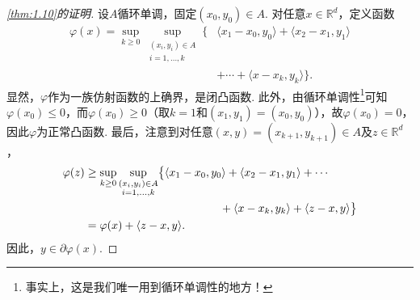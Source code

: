 \begin{proof}[\autoref{thm:1.10}的证明]
设$A$循环单调，固定$(x_0,y_0)\in A$. 对任意$x\in\mathbb R^d$，定义函数
$$
\begin{aligned}
\varphi(x)=\sup_{k\geq0}\sup_{\substack{(x_i,y_i)\in A\\i=1,\ldots,k}}
\bigl\{&\langle x_1-x_0,y_0\rangle+\langle x_2-x_1,y_1\rangle\\
&+\cdots+\langle x-x_k,y_k\rangle\bigr\}.
\end{aligned}
$$
显然，$\varphi$作为一族仿射函数的上确界，是闭凸函数. 此外，由循环单调性\footnote{事实上，这是我们唯一用到循环单调性的地方！}可知$\varphi(x_0)\leq0$，而$\varphi(x_0)\geq0$（取$k=1$和$(x_1,y_1)=(x_0,y_0)$），故$\varphi(x_0)=0$，因此$\varphi$为正常凸函数. 最后，注意到对任意$(x,y)=(x_{k+1},y_{k+1})\in A$及$z\in\mathbb R^d$，
$$
\begin{aligned}
\varphi(z)&\geq\sup_{k\geq0}\sup_{\substack{(x_i,y_i)\in A\\i=1,\ldots,k}}
\bigl\{\langle x_1-x_0,y_0\rangle+\langle x_2-x_1,y_1\rangle+\cdots\\
&\hspace{42mm}+\langle x-x_k,y_k\rangle+\langle z-x,y\rangle\bigr\}\\
&=\varphi(x)+\langle z-x,y\rangle.
\end{aligned}
$$
因此，$y\in\partial\varphi(x)$.
\end{proof}
